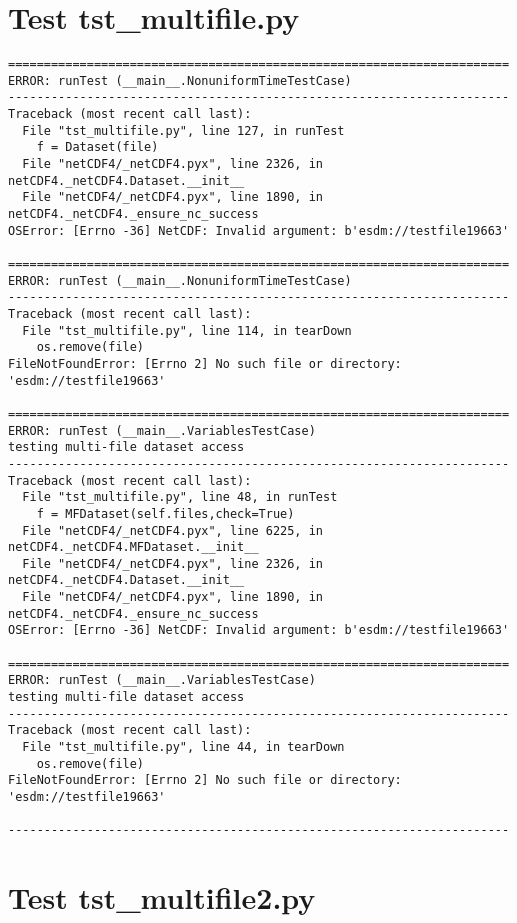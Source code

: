\section{Test tst\_multifile.py}

\begin{verbatim}
======================================================================
ERROR: runTest (__main__.NonuniformTimeTestCase)
----------------------------------------------------------------------
Traceback (most recent call last):
  File "tst_multifile.py", line 127, in runTest
    f = Dataset(file)
  File "netCDF4/_netCDF4.pyx", line 2326, in netCDF4._netCDF4.Dataset.__init__
  File "netCDF4/_netCDF4.pyx", line 1890, in netCDF4._netCDF4._ensure_nc_success
OSError: [Errno -36] NetCDF: Invalid argument: b'esdm://testfile19663'

======================================================================
ERROR: runTest (__main__.NonuniformTimeTestCase)
----------------------------------------------------------------------
Traceback (most recent call last):
  File "tst_multifile.py", line 114, in tearDown
    os.remove(file)
FileNotFoundError: [Errno 2] No such file or directory: 'esdm://testfile19663'

======================================================================
ERROR: runTest (__main__.VariablesTestCase)
testing multi-file dataset access
----------------------------------------------------------------------
Traceback (most recent call last):
  File "tst_multifile.py", line 48, in runTest
    f = MFDataset(self.files,check=True)
  File "netCDF4/_netCDF4.pyx", line 6225, in netCDF4._netCDF4.MFDataset.__init__
  File "netCDF4/_netCDF4.pyx", line 2326, in netCDF4._netCDF4.Dataset.__init__
  File "netCDF4/_netCDF4.pyx", line 1890, in netCDF4._netCDF4._ensure_nc_success
OSError: [Errno -36] NetCDF: Invalid argument: b'esdm://testfile19663'

======================================================================
ERROR: runTest (__main__.VariablesTestCase)
testing multi-file dataset access
----------------------------------------------------------------------
Traceback (most recent call last):
  File "tst_multifile.py", line 44, in tearDown
    os.remove(file)
FileNotFoundError: [Errno 2] No such file or directory: 'esdm://testfile19663'

----------------------------------------------------------------------
\end{verbatim}

\section{Test tst\_multifile2.py}

